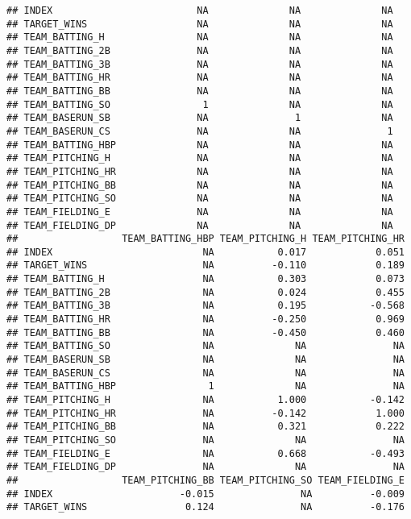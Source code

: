 \documentclass[]{article}
\begin{document}
\begin{verbatim}
## INDEX                         NA              NA              NA
## TARGET_WINS                   NA              NA              NA
## TEAM_BATTING_H                NA              NA              NA
## TEAM_BATTING_2B               NA              NA              NA
## TEAM_BATTING_3B               NA              NA              NA
## TEAM_BATTING_HR               NA              NA              NA
## TEAM_BATTING_BB               NA              NA              NA
## TEAM_BATTING_SO                1              NA              NA
## TEAM_BASERUN_SB               NA               1              NA
## TEAM_BASERUN_CS               NA              NA               1
## TEAM_BATTING_HBP              NA              NA              NA
## TEAM_PITCHING_H               NA              NA              NA
## TEAM_PITCHING_HR              NA              NA              NA
## TEAM_PITCHING_BB              NA              NA              NA
## TEAM_PITCHING_SO              NA              NA              NA
## TEAM_FIELDING_E               NA              NA              NA
## TEAM_FIELDING_DP              NA              NA              NA
##                  TEAM_BATTING_HBP TEAM_PITCHING_H TEAM_PITCHING_HR
## INDEX                          NA           0.017            0.051
## TARGET_WINS                    NA          -0.110            0.189
## TEAM_BATTING_H                 NA           0.303            0.073
## TEAM_BATTING_2B                NA           0.024            0.455
## TEAM_BATTING_3B                NA           0.195           -0.568
## TEAM_BATTING_HR                NA          -0.250            0.969
## TEAM_BATTING_BB                NA          -0.450            0.460
## TEAM_BATTING_SO                NA              NA               NA
## TEAM_BASERUN_SB                NA              NA               NA
## TEAM_BASERUN_CS                NA              NA               NA
## TEAM_BATTING_HBP                1              NA               NA
## TEAM_PITCHING_H                NA           1.000           -0.142
## TEAM_PITCHING_HR               NA          -0.142            1.000
## TEAM_PITCHING_BB               NA           0.321            0.222
## TEAM_PITCHING_SO               NA              NA               NA
## TEAM_FIELDING_E                NA           0.668           -0.493
## TEAM_FIELDING_DP               NA              NA               NA
##                  TEAM_PITCHING_BB TEAM_PITCHING_SO TEAM_FIELDING_E
## INDEX                      -0.015               NA          -0.009
## TARGET_WINS                 0.124               NA          -0.176

\end{verbatim}
\end{document}

